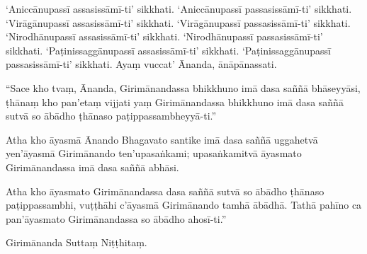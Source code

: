 ‘Aniccānupassī assasissāmī-ti’ sikkhati. ‘Aniccānupassī passasissāmī-ti’
sikkhati. ‘Virāgānupassī assasissāmī-ti’ sikkhati. ‘Virāgānupassī
passasissāmī-ti’ sikkhati. ‘Nirodhānupassī assasissāmī-ti’ sikkhati.
‘Nirodhānupassī passasissāmī-ti’ sikkhati. ‘Paṭinissaggānupassī assasissāmī-ti’
sikkhati. ‘Paṭinissaggānupassī passasissāmī-ti’ sikkhati. Ayaṃ vuccat’ Ānanda,
ānāpānassati.

“Sace kho tvaṃ, Ānanda, Girimānandassa bhikkhuno imā dasa saññā bhāseyyāsi,
ṭhānaṃ kho pan’etaṃ vijjati yaṃ Girimānandassa bhikkhuno imā dasa saññā sutvā so
ābādho ṭhānaso paṭippassambheyyā-ti.”

Atha kho āyasmā Ānando Bhagavato santike imā dasa saññā uggahetvā yen’āyasmā
Girimānando ten’upasaṅkami; upasaṅkamitvā āyasmato Girimānandassa imā dasa saññā
abhāsi.

Atha kho āyasmato Girimānandassa dasa saññā sutvā so ābādho ṭhānaso
paṭippassambhi, vuṭṭhāhi c’āyasmā Girimānando tamhā ābādhā. Tathā pahīno ca
pan’āyasmato Girimānandassa so ābādho ahosī-ti.”

Girimānanda Suttaṃ Niṭṭhitaṃ.



